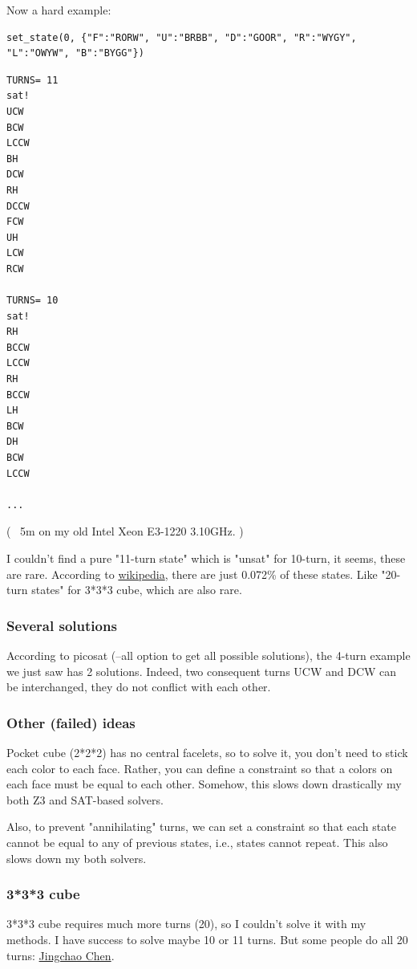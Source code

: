 Now a hard example:

\begin{lstlisting}
set_state(0, {"F":"RORW", "U":"BRBB", "D":"GOOR", "R":"WYGY", "L":"OWYW", "B":"BYGG"})
\end{lstlisting}

\begin{lstlisting}
TURNS= 11
sat!
UCW
BCW
LCCW
BH
DCW
RH
DCCW
FCW
UH
LCW
RCW

TURNS= 10
sat!
RH
BCCW
LCCW
RH
BCCW
LH
BCW
DH
BCW
LCCW

...
\end{lstlisting}

( ~5m on my old Intel Xeon E3-1220 3.10GHz. )

I couldn't find a pure "11-turn state" which is "unsat" for 10-turn, it seems, these are rare.
According to \href{https://en.wikipedia.org/wiki/Pocket_Cube}{wikipedia}, there are just 0.072\% of these states.
Like "20-turn states" for 3*3*3 cube, which are also rare.

\subsubsection{Several solutions}

According to picosat (--all option to get all possible solutions), the 4-turn example we just saw has 2 solutions.
Indeed, two consequent turns UCW and DCW can be interchanged, they do not conflict with each other.

\subsubsection{Other (failed) ideas}

Pocket cube (2*2*2) has no central facelets, so to solve it, you don't need to stick each color to each face.
Rather, you can define a constraint so that a colors on each face must be equal to each other.
Somehow, this slows down drastically my both Z3 and SAT-based solvers.

Also, to prevent "annihilating" turns, we can set a constraint so that each state cannot be equal to any of previous
states, i.e., states cannot repeat.
This also slows down my both solvers.

\subsubsection{3*3*3 cube}

3*3*3 cube requires much more turns (20), so I couldn't solve it with my methods.
I have success to solve maybe 10 or 11 turns.
But some people do all 20 turns: \href{https://arxiv.org/pdf/1105.1436.pdf}{Jingchao Chen}.

